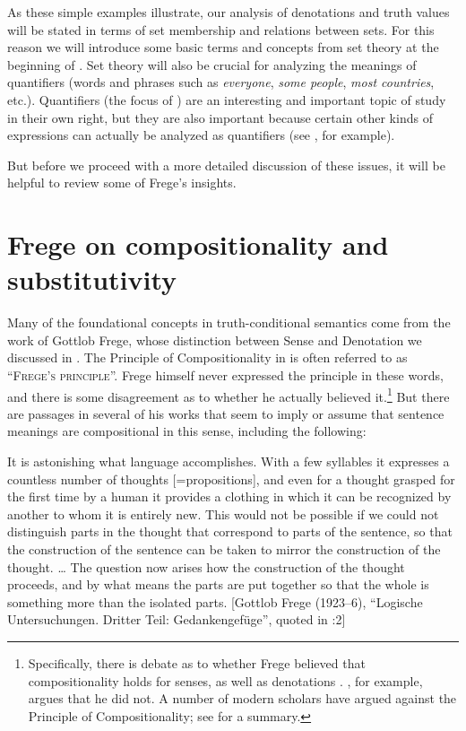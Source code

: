As these simple examples illustrate, our analysis of denotations and truth values will be stated in terms of set membership and relations between sets. For this reason we will introduce some basic terms and concepts from set theory at the beginning of . Set theory will also be crucial for analyzing the meanings of quantifiers (words and phrases such as \textit{everyone}, \textit{some people}, \textit{most countries}, etc.). Quantifiers (the focus of ) are an interesting and important topic of study in their own right, but they are also important because certain other kinds of expressions can actually be analyzed as quantifiers (see , for example).



But before we proceed with a more detailed discussion of these issues, it will be helpful to review some of Frege’s insights.


\section{Frege on compositionality and substitutivity}\label{sec:12.3}

Many of the foundational concepts in truth-conditional semantics come from the work of Gottlob Frege, whose distinction between Sense and Denotation we discussed in . The Principle of Compositionality in  is often referred to as “\textsc{Frege’s principle}”. Frege himself never expressed the principle in these words, and there is some disagreement as to whether he actually believed it.\footnote{Specifically, there is debate as to whether Frege believed that compositionality holds for senses, as well as denotations \citep[12]{Gamut1991b}. \citet{Pelletier2001}, for example, argues that he did not. A number of modern scholars have argued against the Principle of Compositionality; see \citet{Goldberg2015} for a summary.} But there are passages in several of his works that seem to imply or assume that sentence meanings are compositional in this sense, including the following:


It is astonishing what language accomplishes. With a few syllables it expresses a countless number of thoughts [=propositions], and even for a thought grasped for the first time by a human it provides a clothing in which it can be recognized by another to whom it is entirely new. This would not be possible if we could not distinguish parts in the thought that correspond to parts of the sentence, so that the construction of the sentence can be taken to mirror the construction of the thought. … The question now arises how the construction of the thought proceeds, and by what means the parts are put together so that the whole is something more than the isolated parts.   [Gottlob Frege (1923–6), “Logische Untersuchungen. Dritter Teil: Gedankengefüge”, quoted in \citealt{HeimKratzer1998}:2]


